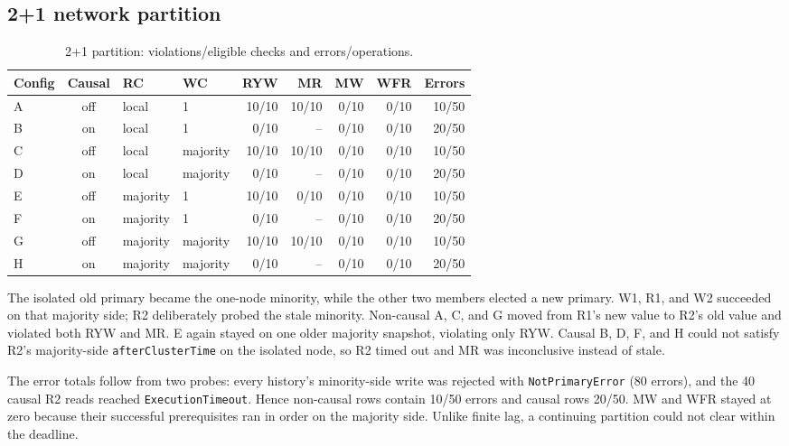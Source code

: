 \documentclass[11pt,a4paper]{article}
\begin{document}
\subsection{2+1 network partition}
\begin{table}[H]
\centering\scriptsize
\caption{2+1 partition: violations/eligible checks and errors/operations.}
\begin{tabular}{@{}lcllrrrrr@{}}
\toprule Config & Causal & RC & WC & RYW & MR & MW & WFR & Errors\\ \midrule
A & off & local & 1 & 10/10 & 10/10 & 0/10 & 0/10 & 10/50\\
B & on  & local & 1 & 0/10 & -- & 0/10 & 0/10 & 20/50\\
C & off & local & majority & 10/10 & 10/10 & 0/10 & 0/10 & 10/50\\
D & on  & local & majority & 0/10 & -- & 0/10 & 0/10 & 20/50\\
E & off & majority & 1 & 10/10 & 0/10 & 0/10 & 0/10 & 10/50\\
F & on  & majority & 1 & 0/10 & -- & 0/10 & 0/10 & 20/50\\
G & off & majority & majority & 10/10 & 10/10 & 0/10 & 0/10 & 10/50\\
H & on  & majority & majority & 0/10 & -- & 0/10 & 0/10 & 20/50\\ \bottomrule
\end{tabular}
\end{table}

The isolated old primary became the one-node minority, while the other two members elected a
new primary. W1, R1, and W2 succeeded on that majority side; R2 deliberately probed the stale
minority. Non-causal A, C, and G moved from R1's new value to R2's old value and violated both
RYW and MR. E again stayed on one older majority snapshot, violating only RYW. Causal B, D,
F, and H could not satisfy R2's majority-side \texttt{afterClusterTime} on the isolated node,
so R2 timed out and MR was inconclusive instead of stale.

The error totals follow from two probes: every history's minority-side write was rejected
with \texttt{NotPrimaryError} (80 errors), and the 40 causal R2 reads reached
\texttt{ExecutionTimeout}. Hence non-causal rows contain 10/50 errors and causal rows 20/50.
MW and WFR stayed at zero because their successful prerequisites ran in order on the
majority side. Unlike finite lag, a continuing partition could not clear within the deadline.
\FloatBarrier
\end{document}
